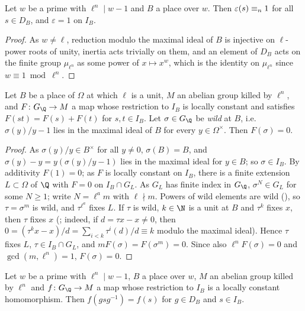 \begin{lemma}\label{pf:kato:epsdec}
Let $w$ be a prime with $\ell^n\mid w-1$ and $B$ a place over $w$. Then $\varepsilon(s)\equiv_{n}1$ for all $s\in D_B$, and
$\varepsilon=1$ on $I_B$.
\end{lemma}

\begin{proof}
As $w\ne\ell$, reduction modulo the maximal ideal of $B$ is injective on $\ell$-power roots of unity, inertia acts
trivially on them, and an element of $D_B$ acts on the finite group $\mu_{\ell^n}$ as some power of $x\mapsto x^w$, which is
the identity on $\mu_{\ell^n}$ since $w\equiv1\bmod\ell^n$.
\end{proof}

\begin{lemma}\label{pf:kato:wild}
Let $B$ be a place of $\Omega$ at which $\ell$ is a unit, $M$ an abelian group killed by $\ell^n$, and $F\colon G_\Q\to M$ a map whose
restriction to $I_B$ is locally constant and satisfies $F(st)=F(s)+F(t)$ for $s,t\in I_B$. Let $\sigma\in G_\Q$ be \emph{wild} at $B$,
i.e.\ $\sigma(y)/y-1$ lies in the maximal ideal of $B$ for every $y\in\Omega^\times$. Then $F(\sigma)=0$.
\end{lemma}

\begin{proof}
As $\sigma(y)/y\in B^\times$ for all $y\ne0$, $\sigma(B)=B$, and $\sigma(y)-y=y(\sigma(y)/y-1)$ lies in the maximal ideal for $y\in B$;
so $\sigma\in I_B$. By additivity $F(1)=0$; as $F$ is locally constant on $I_B$, there is a finite extension $L\subset\Omega$ of $\Q$ with
$F=0$ on $I_B\cap G_L$. As $G_L$ has finite index in $G_\Q$, $\sigma^N\in G_L$ for some $N\ge1$; write $N=\ell^am$ with $\ell\nmid m$.
Powers of wild elements are wild (), so $\tau=\sigma^m$ is wild, and $\tau^{\ell^a}$
fixes $L$. If $\tau$ is wild, $k\in\N$ is a unit at $B$ and $\tau^k$ fixes $x$, then $\tau$ fixes $x$
(; indeed, if $d=\tau x-x\ne0$, then
$0=(\tau^kx-x)/d=\sum_{i<k}\tau^i(d)/d\equiv k$ modulo the maximal ideal). Hence $\tau$ fixes $L$, $\tau\in I_B\cap G_L$, and
$mF(\sigma)=F(\sigma^m)=0$. Since also $\ell^nF(\sigma)=0$ and $\gcd(m,\ell^n)=1$, $F(\sigma)=0$.
\end{proof}

\begin{lemma}\label{pf:kato:tameconj}
Let $w$ be a prime with $\ell^n\mid w-1$, $B$ a place over $w$, $M$ an abelian group killed by $\ell^n$ and $f\colon
G_\Q\to M$ a map whose restriction to $I_B$ is a locally constant homomorphism. Then $f(gsg^{-1})=f(s)$ for
$g\in D_B$ and $s\in I_B$.
\end{lemma}

